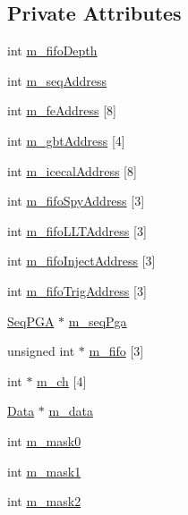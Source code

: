 \subsection*{Private Attributes}
\begin{DoxyCompactItemize}
\item 
int \hyperlink{classFEB__v1_a30473bcdd8f018ad5dac728f6779df9c}{m\+\_\+fifo\+Depth}
\item 
int \hyperlink{classFEB__v1_a1c1eb093fd1733b9510fcf8bc5c7ad08}{m\+\_\+seq\+Address}
\item 
int \hyperlink{classFEB__v1_a4e1945c2d5b434125f375e9d0fc6d99f}{m\+\_\+fe\+Address} \mbox{[}8\mbox{]}
\item 
int \hyperlink{classFEB__v1_ac625855df976f16694178f1a4c0eef1e}{m\+\_\+gbt\+Address} \mbox{[}4\mbox{]}
\item 
int \hyperlink{classFEB__v1_adf21041831669e75283dd2a88fbaddf5}{m\+\_\+icecal\+Address} \mbox{[}8\mbox{]}
\item 
int \hyperlink{classFEB__v1_a15b48648ba4534e732376b68bddc5d34}{m\+\_\+fifo\+Spy\+Address} \mbox{[}3\mbox{]}
\item 
int \hyperlink{classFEB__v1_a68be75ba59d1c551163a9596dc1d235a}{m\+\_\+fifo\+L\+L\+T\+Address} \mbox{[}3\mbox{]}
\item 
int \hyperlink{classFEB__v1_afd035f292061e1823ed64471bb0228ef}{m\+\_\+fifo\+Inject\+Address} \mbox{[}3\mbox{]}
\item 
int \hyperlink{classFEB__v1_ad41f8756c4e15815c6d5e35902cf2257}{m\+\_\+fifo\+Trig\+Address} \mbox{[}3\mbox{]}
\item 
\hyperlink{classSeqPGA}{Seq\+P\+GA} $\ast$ \hyperlink{classFEB__v1_a6c7804ac86796f233a8393043adf2e77}{m\+\_\+seq\+Pga}
\item 
unsigned int $\ast$ \hyperlink{classFEB__v1_ae5b770f2f5ffb97324862c93e3153985}{m\+\_\+fifo} \mbox{[}3\mbox{]}
\item 
int $\ast$ \hyperlink{classFEB__v1_a383c35f10769b16c6a719494594899c6}{m\+\_\+ch} \mbox{[}4\mbox{]}
\item 
\hyperlink{classData}{Data} $\ast$ \hyperlink{classFEB__v1_a1c9dbc3660021dba1f58666d0097abb0}{m\+\_\+data}
\item 
int \hyperlink{classFEB__v1_ab49d6a271bdfddd9c7fac9435e4e686d}{m\+\_\+mask0}
\item 
int \hyperlink{classFEB__v1_a1cbadb02155e2defdff6d6c8f70eb945}{m\+\_\+mask1}
\item 
int \hyperlink{classFEB__v1_a25f03f6de00618dd575fc1f77a9af9ee}{m\+\_\+mask2}
\item 

\end{DoxyCompactItemize}
